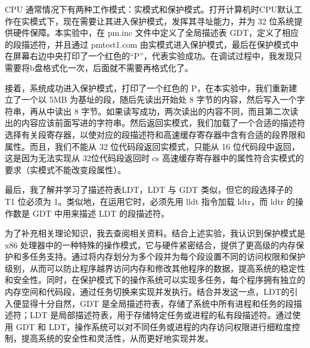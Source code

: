 CPU 通常情况下有两种工作模式：实模式和保护模式。打开计算机时CPU默认工作在实模式下，现在需要让其进入保护模式，发挥其寻址能力，并为 32 位系统提供硬件保障。本实验中，在 pm.inc 文件中定义了全局描述表 GDT，定义了相应的段描述符，并且通过 pmtest1.com 由实模式进入保护模式，最后在保护模式中在屏幕右边中央打印了一个红色的“P”，代表实验成功。在调试过程中，我发现只需要将b盘格式化一次，后面就不需要再格式化了。\par
接着，系统成功进入保护模式，打印了一个红色的 P，在本实验中，我们重新建立了一个以 5MB 为基址的段，随后先读出开始处 8 字节的内容，然后写入一个字符串，再从中读出 8 字节。如果读写成功，两次读出的内容不同，而且第二次读出的内容应该前面写进的字符串。然后返回实模式，我们加载了一个合适的描述符选择有关段寄存器，以使对应的段描述符和高速缓存寄存器中含有合适的段界限和属性。而且，我们不能从 32 位代码段返回实模式，只能从 16 位代码段中返回，这是因为无法实现从 32位代码段返回时 cs 高速缓存寄存器中的属性符合实模式的要求（实模式不能改变段属性）。\par
最后，我了解并学习了描述符表LDT，LDT 与 GDT 类似，但它的段选择子的 T1 位必须为 1。类似地，在运用它时，必须先用 lldt 指令加载 ldtr，而 ldtr 的操作数是 GDT 中用来描述 LDT 的段描述符。\par
为了补充相关理论知识，我去查阅相关资料\cite{80286与保护模式}。结合上述实验，我认识到保护模式是 x86 处理器中的一种特殊的操作模式，它与硬件紧密结合，提供了更高级的内存保护和多任务支持。通过将内存划分为多个段并为每个段设置不同的访问权限和保护级别，从而可以防止程序越界访问内存和修改其他程序的数据，提高系统的稳定性和安全性。同时，在保护模式下的操作系统可以实现多任务，每个程序拥有独立的内存空间和代码段，通过任务切换来实现并发执行。结合并发这一点，LDT的引入便显得十分自然，GDT 是全局描述符表，存储了系统中所有进程和任务的段描述符；LDT 是局部描述符表，用于存储特定任务或进程的私有段描述符。通过使用 GDT 和 LDT，操作系统可以对不同任务或进程的内存访问权限进行细粒度控制，提高系统的安全性和灵活性，从而更好地实现并发。
